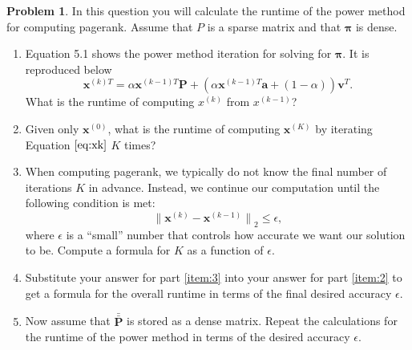 \documentclass[10pt]{article}
\theoremstyle{definition}
\newtheorem{problem}{Problem}
\newcommand{\p}{\mathbf P}
\newcommand{\pb}{\bar {\p}}
\newcommand{\pbb}{\bar {\pb}}
\newcommand{\pr}{\bm \pi}
\newcommand{\x}{\mathbf x}
\newcommand{\ltwo}[1]{{\lVert {#1} \rVert}_2}
\begin{document}
\begin{problem}
    In this question you will calculate the runtime of the power method for computing pagerank.
    Assume that $P$ is a sparse matrix and that $\pr$ is dense.

    \begin{enumerate}
        \item
            Equation 5.1 shows the power method iteration for solving for $\pr$.
            It is reproduced below
            \begin{equation}
                \x^{(k)T}
                =
                \alpha \x^{(k-1)T} \p + (\alpha \x^{(k-1)T} \mathbf a + (1-\alpha)) \mathbf v^T
                .
                \label{eq:xk}
            \end{equation}
            What is the runtime of computing $x^{(k)}$ from $x^{(k-1)}$? %
            \vspace{4in}

        \item 
            \label{item:2}
            Given only $\x^{(0)}$, what is the runtime of computing $\x^{(K)}$ by iterating Equation $\eqref{eq:xk}$ $K$ times?
            \vspace{4in}

        \item
            \label{item:3}
            When computing pagerank,
            we typically do not know the final number of iterations $K$ in advance.
            Instead, we continue our computation until the following condition is met:
            \begin{equation}
                \ltwo { \x^{(k)} - \x^{(k-1)} } \le \epsilon,
            \end{equation}
            where $\epsilon$ is a ``small'' number that controls how accurate we want our solution to be.
            Compute a formula for $K$ as a function of $\epsilon$.
            \vspace{4in}

        \item
            Substitute your answer for part \ref{item:3} into your answer for part \ref{item:2} to get a formula for the overall runtime in terms of the final desired accuracy $\epsilon$.
            \vspace{4in}

        \item
            Now assume that $\pbb$ is stored as a dense matrix.
            Repeat the calculations for the runtime of the power method in terms of the desired accuracy $\epsilon$.
            \vspace{4in}


\end{enumerate}
\end{problem}
\end{document}
